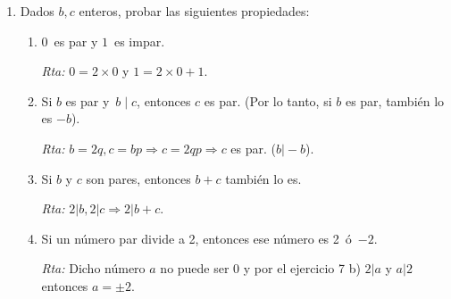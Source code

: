 \documentclass[12pt,spanish,makeidx]{amsbook}
\newcommand{\rta}{\noindent\textit{Rta: }}
\begin{document}
\begin{enumerate}
\begin{enumerate}
	\rta Tenemos $b\vert a \Rightarrow a=bq$ y   $a\vert b\Rightarrow b=ap$ luego $a=apq$ y  $a\neq0 \Rightarrow pq=1$. El inciso a)  dice que $p=q=1$ o $p=q=-1$ de donde se sigue el resultado buscado.
	
	\item Si $a | 1$, entonces \,$a=1$\, \'o \,$a=-1$.
	
	\rta Este es un corolario del inciso \textit{b)} tomando $b=1$ ya que $1\vert a$, $\forall a\in \mathbb{Z}$.
	
	\item Si $a \neq 0$, $a | b$\, y \,$a | c$, entonces \,$a | (b+c)$\, y \,$a | (b-c)$.
	
	\rta Como $b=aq$ y $c=ap$, $b\pm c=a(q\pm p)$.
	
	\item Si $a \neq 0$, $a | b$\, y \,$a | (b+c)$, entonces \,$a | c$.
	
	\rta Se puede usar el inciso anterior con $b=0$.
	
	\item Si $a \neq 0$\, y \,$a | b$, entonces \,$a| b\cdot c$.
	
	\rta Si $b=aq$ entonces $b.c=aqc \Rightarrow a\vert b.c$.
\end{enumerate}

\smallskip

\item Dados $b,c$ enteros, probar las siguientes propiedades:
\begin{enumerate}
	\item  $0$\, es par y $1$\, es impar.
	
	\rta $0=2\times 0$ y $1=2\times 0+1$.
	
	\item  Si $b$ es par y \,$b \mid c$, entonces $c$ es par.  (Por lo tanto, si $b$ es par, tambi\'en lo es $-b$).
	
	\rta $b=2q, c=bp\Rightarrow c=2qp \Rightarrow c$ es par. ($b\vert -b$).
	
	\item  Si $b$ y $c$ son pares, entonces $b+c$ tambi\'en lo es. %
	
	\rta $2\vert b, 2\vert c \Rightarrow 2\vert b+c$.
	
	\item  Si un número par divide a 2, entonces ese número es 2\, \'o \,$-2$.
	
	\rta Dicho número $a$ no puede ser 0 y por el ejercicio 7 b) $2\vert a$ y $a\vert 2$ entonces $a= \pm2$.
	

\end{enumerate}
\end{enumerate}
\end{document}
